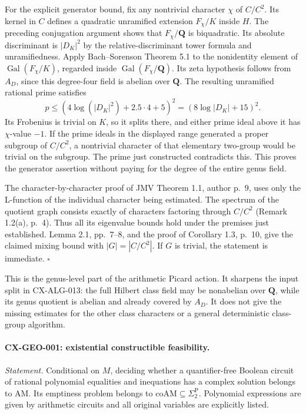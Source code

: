 For the explicit generator bound, fix any nontrivial character $\chi$ of
$C/C^2$. Its kernel in $C$ defines a quadratic unramified extension
$F_\chi/K$ inside $H$. The preceding conjugation argument shows that
$F_\chi/\mathbf Q$ is biquadratic. Its absolute discriminant is
$|D_K|^2$ by the relative-discriminant tower formula and unramifiedness.
Apply Bach--Sorenson Theorem 5.1 to the nonidentity element of
$\operatorname{Gal}(F_\chi/K)$, regarded inside
$\operatorname{Gal}(F_\chi/\mathbf Q)$. Its zeta hypothesis follows from
$A_D$, since this degree-four field is abelian over $\mathbf Q$.
The resulting unramified rational prime satisfies
\[
            p\le(4\log(|D_K|^2)+2.5\cdot4+5)^2
                    =(8\log|D_K|+15)^2.
\]
Its Frobenius is trivial on $K$, so it splits there, and either prime
ideal above it has $\chi$-value $-1$. If the prime ideals in the displayed
range generated a proper subgroup of $C/C^2$, a nontrivial character of
that elementary two-group would be trivial on the subgroup. The prime just
constructed contradicts this. This proves the generator assertion without
paying for the degree of the entire genus field.

The character-by-character proof of JMV Theorem 1.1, author p.~9,
uses only the L-function of the individual character being estimated.
The spectrum of the quotient graph consists exactly of characters
factoring through $C/C^2$ (Remark 1.2(a), p.~4). Thus all its eigenvalue
bounds hold under the premises just established. Lemma 2.1, pp.~7--8,
and the proof of Corollary 1.3, p.~10, give the claimed mixing bound
with $|G|=|C/C^2|$. If $G$ is trivial, the statement is immediate.
\hfill$\square$

This is the genus-level part of the arithmetic Picard action. It sharpens
the input split in CX-ALG-013: the full Hilbert class field may be
nonabelian over $\mathbf Q$, while its genus quotient is abelian and
already covered by $A_D$. It does not give the missing estimates for the
other class characters or a general deterministic class-group algorithm.

\paragraph{CX-GEO-001: existential constructible feasibility.}
\emph{Statement.} Conditional on $M$, deciding whether a quantifier-free
Boolean circuit of rational polynomial equalities and inequations has a
complex solution belongs to $\mathrm{AM}$. Its emptiness problem belongs to
$\mathrm{coAM}\subseteq\Sigma_2^{\mathrm P}$. Polynomial expressions are
given by arithmetic circuits and all original variables are explicitly listed.

